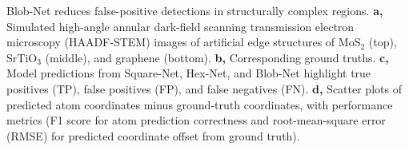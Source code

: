 \caption[Blob-Net reduces false-positive detections in structurally complex regions]{Blob-Net reduces false-positive detections in structurally complex regions. \textbf{a,} Simulated high-angle annular dark-field scanning transmission electron microscopy (HAADF-STEM) images of artificial edge structures of $\mathrm{MoS_2}$ (top), $\mathrm{SrTiO_3}$ (middle), and graphene (bottom). \textbf{b,} Corresponding ground truths. \textbf{c,} Model predictions from Square-Net, Hex-Net, and Blob-Net highlight true positives (TP), false positives (FP), and false negatives (FN). \textbf{d,} Scatter plots of predicted atom coordinates minus ground-truth coordinates, with performance metrics (F1 score for atom prediction correctness and root-mean-square error (RMSE) for predicted coordinate offset from ground truth).}
